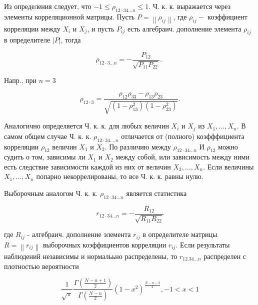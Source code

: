 \documentclass[10pt]{article}
\begin{document}
Из определения следует, что $-1 \leqslant \rho_{12 \cdot 34 \ldots n} \leqslant 1$. Ч. к. к. выражается через элементы корреляционной матрицы. Пусть $P=\left\|\rho_{i j}\right\|$, где $\rho_{i j}-$ коэффициент корреляции между $X_{i}$ и $X_{j}$, и пусть $P_{i j}$ есть алгебраич. дополнение элемента $\rho_{i j}$ в определителе $|P|$, тогда



\[

\rho_{12 \cdot 3 \ldots n}=-\frac{P_{12}}{\sqrt{P_{11} P_{22}}} \text {. }

\]



Напр., при $n=3$



\[

\rho_{12 \cdot 3}=\frac{\rho_{12} \rho_{33}-\rho_{13} \rho_{23}}{\sqrt{\left(1-\rho_{13}^{2}\right)\left(1-\rho_{23}^{2}\right)}} .

\]



Аналогично определяется Ч. к. к. для любых величин $X_{i}$ и $X_{j}$ из $X_{1}, \ldots, X_{n}$. В самом общем случае Ч. к. к. $\rho_{12 \cdot 34 \ldots . n}$ отличается от (полного) коэфффициента корреляции $\rho_{12}$ величин $X_{1}$ и $X_{2}$. По различию между $\rho_{12 \cdot 34 \ldots n}$ И $\rho_{12}$ можно судить о том, зависимы ли $X_{1}$ и $X_{2}$ между собой, или зависимость между ними есть следствие зависимости каждой из них от величин $X_{3}, \ldots, X_{n}$. Если величины $X_{1}, \ldots, X_{n}$ попарно некоррелированы, то все Ч. к. к. равны нулю.



Выборочным аналогом Ч. к. к. $\rho_{12 \cdot 34 \ldots n}$ является статистика



\[

r_{12 \cdot 34 \ldots n}=-\frac{R_{12}}{\sqrt{R_{11} R_{22}}}

\]



где $R_{i j}$ - алгебраич. дополнение элемента $r_{i j}$ в определителе матрицы $R=\left\|r_{i j}\right\|$ выборочных коэффициентов корреляции $r_{i j}$. Если результаты наблюдений независимы и нормалььно распределены, то $r_{12.34 \ldots n}$ распределен с плотностью вероятности



\[

\frac{1}{\sqrt{\pi}} \frac{\Gamma\left(\frac{N-n+1}{2}\right)}{\Gamma\left(\frac{N-n}{2}\right)}\left(1-x^{2}\right)^{\frac{N-n-2}{2}},-1<x<1

\]
\end{document}
